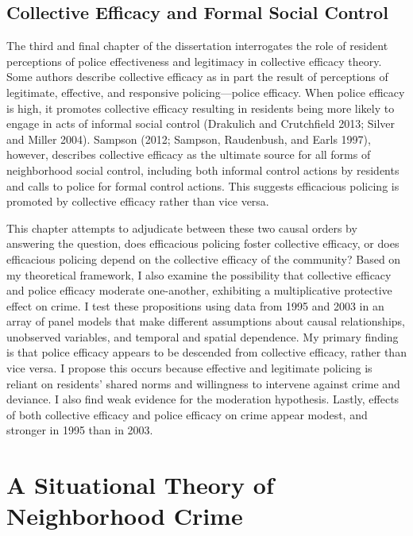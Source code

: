 \documentclass [11pt, proquest] {uwthesis}[2015/03/03]
\begin{document}
\hypertarget{collective-efficacy-and-formal-social-control}{%
\section{Collective Efficacy and Formal Social Control}\label{collective-efficacy-and-formal-social-control}}

The third and final chapter of the dissertation interrogates the role of resident perceptions of police effectiveness and legitimacy in collective efficacy theory. Some authors describe collective efficacy as in part the result of perceptions of legitimate, effective, and responsive policing---police efficacy. When police efficacy is high, it promotes collective efficacy resulting in residents being more likely to engage in acts of informal social control (Drakulich and Crutchfield 2013; Silver and Miller 2004). Sampson (2012; Sampson, Raudenbush, and Earls 1997), however, describes collective efficacy as the ultimate source for all forms of neighborhood social control, including both informal control actions by residents and calls to police for formal control actions. This suggests efficacious policing is promoted by collective efficacy rather than vice versa.

This chapter attempts to adjudicate between these two causal orders by answering the question, does efficacious policing foster collective efficacy, or does efficacious policing depend on the collective efficacy of the community? Based on my theoretical framework, I also examine the possibility that collective efficacy and police efficacy moderate one-another, exhibiting a multiplicative protective effect on crime. I test these propositions using data from 1995 and 2003 in an array of panel models that make different assumptions about causal relationships, unobserved variables, and temporal and spatial dependence. My primary finding is that police efficacy appears to be descended from collective efficacy, rather than vice versa. I propose this occurs because effective and legitimate policing is reliant on residents' shared norms and willingness to intervene against crime and deviance. I also find weak evidence for the moderation hypothesis. Lastly, effects of both collective efficacy and police efficacy on crime appear modest, and stronger in 1995 than in 2003.

\hypertarget{theory}{%
\chapter{A Situational Theory of Neighborhood Crime}\label{theory}}
\end{document}
